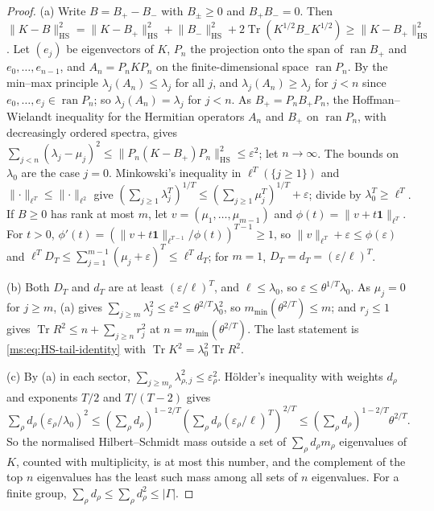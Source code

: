 \documentclass[11pt,a4paper]{amsart}
\theoremstyle{definition}
\theoremstyle{remark}
\numberwithin{equation}{section}
\DeclareMathOperator{\Tr}{Tr}        %
\newcommand{\norm}[1]{\lVert #1\rVert}     %
\newcommand{\abs}[1]{\lvert #1\rvert}      %
\begin{document}
\begin{proof}
(a) Write $B=B_+-B_-$ with $B_\pm\ge0$ and $B_+B_-=0$. Then $\norm{K-B}_{\mathrm{HS}}^2=\norm{K-B_+}_{\mathrm{HS}}^2+\norm{B_-}_{\mathrm{HS}}^2+2\Tr(K^{1/2}B_-K^{1/2})\ge\norm{K-B_+}_{\mathrm{HS}}^2$. Let $(e_j)$ be eigenvectors of $K$, $P_n$ the projection onto the span of $\operatorname{ran}B_+$ and $e_0,\dots,e_{n-1}$, and $A_n=P_nKP_n$ on the finite-dimensional space $\operatorname{ran}P_n$. By the min--max principle $\lambda_j(A_n)\le\lambda_j$ for all $j$, and $\lambda_j(A_n)\ge\lambda_j$ for $j<n$ since $e_0,\dots,e_j\in\operatorname{ran}P_n$; so $\lambda_j(A_n)=\lambda_j$ for $j<n$. As $B_+=P_nB_+P_n$, the Hoffman--Wielandt inequality \cite{hoffman1953} for the Hermitian operators $A_n$ and $B_+$ on $\operatorname{ran}P_n$, with decreasingly ordered spectra, gives $\sum_{j<n}(\lambda_j-\mu_j)^2\le\norm{P_n(K-B_+)P_n}_{\mathrm{HS}}^2\le\varepsilon^2$; let $n\to\infty$. The bounds on $\lambda_0$ are the case $j=0$. Minkowski's inequality in $\ell^T(\{j\ge1\})$ and $\norm\cdot_{\ell^T}\le\norm\cdot_{\ell^2}$ give $(\sum_{j\ge1}\lambda_j^T)^{1/T}\le(\sum_{j\ge1}\mu_j^T)^{1/T}+\varepsilon$; divide by $\lambda_0^T\ge\ell^T$. If $B\ge0$ has rank at most $m$, let $v=(\mu_1,\dots,\mu_{m-1})$ and $\phi(t)=\norm{v+t\mathbf 1}_{\ell^T}$. For $t>0$, $\phi'(t)=(\norm{v+t\mathbf1}_{\ell^{T-1}}/\phi(t))^{T-1}\ge1$, so $\norm v_{\ell^T}+\varepsilon\le\phi(\varepsilon)$ and $\ell^TD_T\le\sum_{j=1}^{m-1}(\mu_j+\varepsilon)^T\le\ell^Td_T$; for $m=1$, $D_T=d_T=(\varepsilon/\ell)^T$.

(b) Both $D_T$ and $d_T$ are at least $(\varepsilon/\ell)^T$, and $\ell\le\lambda_0$, so $\varepsilon\le\theta^{1/T}\lambda_0$. As $\mu_j=0$ for $j\ge m$, (a) gives $\sum_{j\ge m}\lambda_j^2\le\varepsilon^2\le\theta^{2/T}\lambda_0^2$, so $m_{\min}(\theta^{2/T})\le m$; and $r_j\le1$ gives $\Tr R^2\le n+\sum_{j\ge n}r_j^2$ at $n=m_{\min}(\theta^{2/T})$. The last statement is \eqref{ms:eq:HS-tail-identity} with $\Tr K^2=\lambda_0^2\Tr R^2$.

(c) By (a) in each sector, $\sum_{j\ge m_\rho}\lambda_{\rho,j}^2\le\varepsilon_\rho^2$. H\"older's inequality with weights $d_\rho$ and exponents $T/2$ and $T/(T-2)$ gives $\sum_\rho d_\rho(\varepsilon_\rho/\lambda_0)^2\le(\sum_\rho d_\rho)^{1-2/T}(\sum_\rho d_\rho(\varepsilon_\rho/\ell)^T)^{2/T}\le(\sum_\rho d_\rho)^{1-2/T}\theta^{2/T}$. So the normalised Hilbert--Schmidt mass outside a set of $\sum_\rho d_\rho m_\rho$ eigenvalues of $K$, counted with multiplicity, is at most this number, and the complement of the top $n$ eigenvalues has the least such mass among all sets of $n$ eigenvalues. For a finite group, $\sum_\rho d_\rho\le\sum_\rho d_\rho^2\le\abs\Gamma$.


\end{proof}
\end{document}
